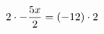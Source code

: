 \documentclass[preview]{standalone}
\begin{document}
\begin{align*}
\special{dvisvgm:raw <g id='unique000'>}2 \cdot - \frac{5 x}{2} = (-12) \cdot 2\special{dvisvgm:raw </g>}
\end{align*}
\end{document}
